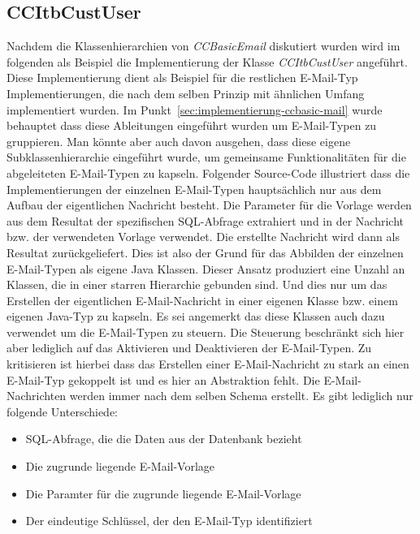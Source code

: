 \subsection{CCItbCustUser}
Nachdem die Klassenhierarchien von \emph{CCBasicEmail} diskutiert wurden wird im folgenden als Beispiel die Implementierung der Klasse \emph{CCItbCustUser} angeführt. Diese Implementierung dient als Beispiel für die restlichen E-Mail-Typ Implementierungen, die nach dem selben Prinzip mit ähnlichen Umfang implementiert wurden. Im Punkt~\ref{sec:implementierung-ccbasic-mail} wurde behauptet dass diese Ableitungen eingeführt wurden um E-Mail-Typen zu gruppieren. Man könnte aber auch davon ausgehen, dass diese eigene Subklassenhierarchie eingeführt wurde, um gemeinsame Funktionalitäten für die abgeleiteten E-Mail-Typen zu kapseln. 
\newline
\newline
Folgender Source-Code illustriert dass die Implementierungen der einzelnen E-Mail-Typen hauptsächlich nur aus dem Aufbau der eigentlichen Nachricht besteht. Die Parameter für die Vorlage werden aus dem Resultat der spezifischen SQL-Abfrage extrahiert und in der Nachricht bzw. der verwendeten Vorlage verwendet. Die erstellte Nachricht wird dann als Resultat zurückgeliefert. Dies ist also der Grund für das Abbilden der einzelnen E-Mail-Typen als eigene Java Klassen. Dieser Ansatz produziert eine Unzahl an Klassen, die in einer starren Hierarchie gebunden sind. Und dies nur um das Erstellen der eigentlichen E-Mail-Nachricht in einer eigenen Klasse bzw. einem eigenen Java-Typ zu kapseln. Es sei angemerkt das diese Klassen auch dazu verwendet um die E-Mail-Typen zu steuern. Die Steuerung beschränkt sich hier aber lediglich auf das Aktivieren und Deaktivieren der E-Mail-Typen. Zu kritisieren ist hierbei dass das Erstellen einer E-Mail-Nachricht zu stark an einen E-Mail-Typ gekoppelt ist und es hier an Abstraktion fehlt. Die E-Mail-Nachrichten werden immer nach dem selben Schema erstellt. Es gibt lediglich nur folgende Unterschiede:
\begin{itemize}
	\item SQL-Abfrage, die die Daten aus der Datenbank bezieht
	\item Die zugrunde liegende E-Mail-Vorlage
	\item Die Paramter für die zugrunde liegende E-Mail-Vorlage
	\item Der eindeutige Schlüssel, der den E-Mail-Typ identifiziert
\end{itemize}
